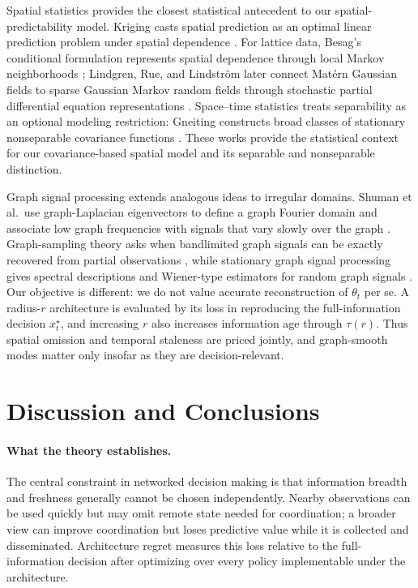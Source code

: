 \documentclass[11pt]{article}
\begin{document}
Spatial statistics provides the closest statistical antecedent to our spatial-predictability model. Kriging casts spatial prediction as an optimal linear prediction problem under spatial dependence \cite{cressie1990origins}. For lattice data, Besag's conditional formulation represents spatial dependence through local Markov neighborhoods \cite{besag1974spatial}; Lindgren, Rue, and Lindstr\"om later connect Mat\'ern Gaussian fields to sparse Gaussian Markov random fields through stochastic partial differential equation representations \cite{lindgren2011explicit}. Space--time statistics treats separability as an optional modeling restriction: Gneiting constructs broad classes of stationary nonseparable covariance functions \cite{gneiting2002nonseparable}. These works provide the statistical context for our covariance-based spatial model and its separable and nonseparable distinction.

Graph signal processing extends analogous ideas to irregular domains. Shuman et al.\ use graph-Laplacian eigenvectors to define a graph Fourier domain and associate low graph frequencies with signals that vary slowly over the graph \cite{shuman2013emerging}. Graph-sampling theory asks when bandlimited graph signals can be exactly recovered from partial observations \cite{chen2015discrete}, while stationary graph signal processing gives spectral descriptions and Wiener-type estimators for random graph signals \cite{perraudin2017stationary}. Our objective is different: we do not value accurate reconstruction of $\theta_t$ per se. A radius-$r$ architecture is evaluated by its loss in reproducing the full-information decision $x_t^\star$, and increasing $r$ also increases information age through $\tau(r)$. Thus spatial omission and temporal staleness are priced jointly, and graph-smooth modes matter only insofar as they are decision-relevant.


\section{Discussion and Conclusions}
\label{sec:discussion_conclusions}

\paragraph{What the theory establishes.}
The central constraint in networked decision making is that information breadth
and freshness generally cannot be chosen independently. Nearby observations can
be used quickly but may omit remote state needed for coordination; a broader
view can improve coordination but loses predictive value while it is collected
and disseminated. Architecture regret measures this loss relative to the
full-information decision after optimizing over every policy implementable
under the architecture.
\end{document}
